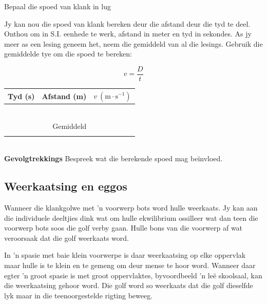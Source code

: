 \begin{i_experiment}{Bepaal die spoed van klank in lug}
\begin{minipage}{.45\textwidth}
Jy kan nou die spoed van klank bereken deur die afstand deur die tyd te deel. Onthou om in S.I. eenhede te werk, afstand in meter en tyd in sekondes. As jy meer as een lesing geneem het, neem die gemiddeld van al die lesings. Gebruik die gemiddelde tye om die spoed te bereken: 

\begin{equation*}
 v = \frac{D}{t}
\end{equation*}
\end{minipage}\hspace{.03\textwidth}
\begin{minipage}{.5\textwidth}
\begin{table}[H]
 \begin{tabular}{|c|c|c|}\hline\hline
Tyd (s) & Afstand (m) & $v~(\text{m}\cdot\text{s}^{-1})$ \\\hline
 & & \\\hline 
 & & \\\hline 
 & & \\\hline 
 & & \\\hline 
 & & \\\hline 
 & & \\\hline \hline
\multicolumn{3}{|c|}{Gemiddeld} \\ \hline
 & & \\\hline 
 \end{tabular}
\end{table}
\end{minipage}\\
\textbf{Gevolgtrekkings}
Bespreek wat die berekende spoed mag be\"{i}nvloed.
\end{i_experiment}

\subsection{Weerkaatsing en eggos}

Wanneer die klankgolwe met 'n voorwerp bots word hulle weerkaats. Jy kan aan die individuele deeltjies dink wat om hulle ekwilibrium ossilleer wat dan teen die voorwerp bots soos die golf verby gaan. Hulle bons van die voorwerp af wat veroorsaak dat die golf weerkaats word.

In 'n spasie met baie klein voorwerpe is daar weerkaatsing op elke oppervlak maar hulle is te klein en te gemeng om deur mense te hoor word. Wanneer daar egter 'n groot spasie is met groot oppervlaktes, byvoordbeeld 'n le\"e skoolsaal, kan die weerkaatsing gehoor word. Die golf word so weerkaats dat die golf dieselfde lyk maar in die teenoorgestelde rigting beweeg.

